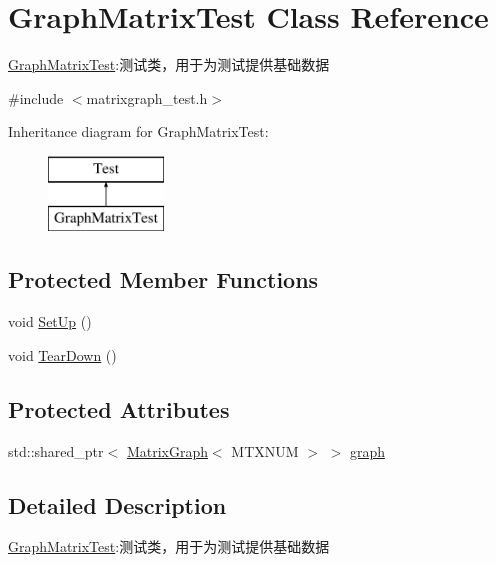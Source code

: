\hypertarget{class_graph_matrix_test}{}\section{Graph\+Matrix\+Test Class Reference}
\label{class_graph_matrix_test}


\hyperlink{class_graph_matrix_test}{Graph\+Matrix\+Test}\+:测试类，用于为测试提供基础数据  




{\ttfamily \#include $<$matrixgraph\+\_\+test.\+h$>$}

Inheritance diagram for Graph\+Matrix\+Test\+:\begin{figure}[H]
\begin{center}
\leavevmode
\includegraphics[height=2.000000cm]{class_graph_matrix_test}
\end{center}
\end{figure}
\subsection*{Protected Member Functions}
\begin{DoxyCompactItemize}
\item 
void \hyperlink{class_graph_matrix_test_a0bf059febd79340f3fd0a07998b86084}{Set\+Up} ()
\item 
void \hyperlink{class_graph_matrix_test_a6ecc6a16df121b02fd29a278f38083c9}{Tear\+Down} ()
\end{DoxyCompactItemize}
\subsection*{Protected Attributes}
\begin{DoxyCompactItemize}
\item 
std\+::shared\+\_\+ptr$<$ \hyperlink{struct_introduction_to_algorithm_1_1_graph_algorithm_1_1_matrix_graph}{Matrix\+Graph}$<$ M\+T\+X\+N\+U\+M $>$ $>$ \hyperlink{class_graph_matrix_test_a466258802e52f0a5408f78e809cd6d7c}{graph}
\end{DoxyCompactItemize}


\subsection{Detailed Description}
\hyperlink{class_graph_matrix_test}{Graph\+Matrix\+Test}\+:测试类，用于为测试提供基础数据 

